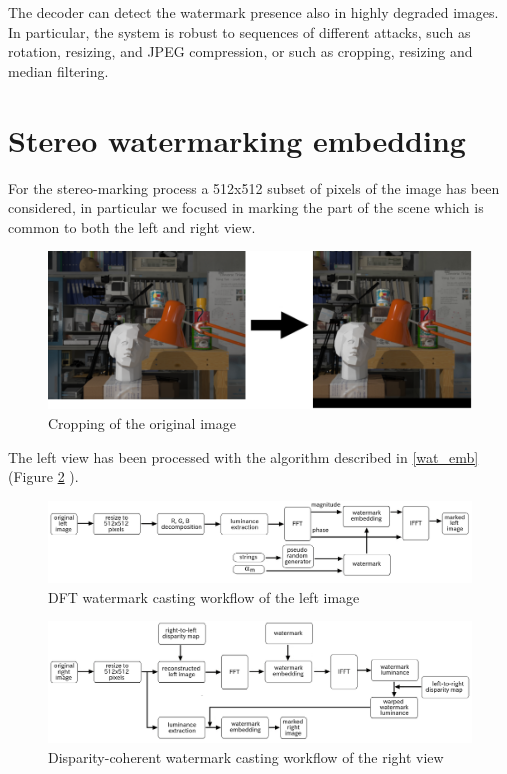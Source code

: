 The decoder can detect the watermark presence also in highly degraded images. In particular, the system is robust to sequences of different attacks, such as rotation, resizing, and JPEG compression, or such as cropping, resizing and median filtering.

\section{Stereo watermarking embedding}

For the stereo-marking process a 512x512 subset of pixels of the image has been considered, in particular we focused in marking the part of the scene which is common to both the left and right view.

\begin{figure}[h!]
\centering
\includegraphics[width=1\textwidth]{./img/cropping.png}
\caption{\small{Cropping of the original image}}
\label{fig:cropped}
\end{figure}

The left view has been processed with the algorithm described in \ref{wat_emb} (Figure \ref{fig:left_wat} ).\newline 


\begin{figure}[h!]
\centering
\includegraphics[width=1\textwidth]{./img/left_wat.png}
\caption{\small{DFT watermark casting workflow of the left image}\label{fig:left_wat}}

\end{figure}

\begin{figure}[h!]
\centering
\includegraphics[width=1\textwidth]{./img/pros.png}
\caption{\small{Disparity-coherent watermark casting workflow of the right view}}
\label{fig:right_wat}
\end{figure}




